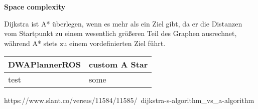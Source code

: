 \documentclass{article}
\begin{document}
\textbf{Space complexity}\newline

Dijkstra ist A* überlegen, wenn es mehr als ein Ziel gibt, da er die Distanzen vom Startpunkt zu einem wesentlich größeren Teil des Graphen ausrechnet, während A* stets zu einem vordefinierten Ziel führt.

\begin{table}[!htbp]
    \begin{tabular}{p{7cm}|p{7cm}}
        DWAPlannerROS & custom A Star \\ \bottomrule
        test & some
    \end{tabular}
\end{table}

https://www.slant.co/versus/11584/11585/~dijkstra-s-algorithm_vs_a-algorithm
\end{document}
